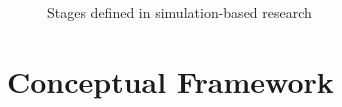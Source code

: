 \documentclass[11pt,oneside,a4paper,openright]{report}
\begin{document}
\begin{figure}[h]
\centering
\setlength\fboxsep{0pt}
\setlength\fboxrule{0.5pt}
\caption{Stages defined in simulation-based research \cite{RussellNorvig}}
\label{fig:SimStages}
\end{figure}







\section{Conceptual Framework}
\end{document}
